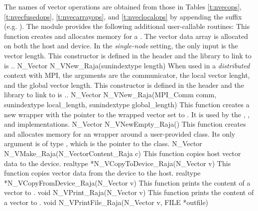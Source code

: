 The names of vector operations are obtained from those in Tables \ref{t:nvecops},
\ref{t:nvecfusedops}, \ref{t:nvecarrayops}, and \ref{t:nveclocalops}
by appending the suffix  (e.g. ).
The module {\nvecraja}  provides the following additional user-callable routines:
{
  This function creates and allocates memory for a {\cuda} .
  The vector data array is allocated on both the host and device.
}
{
  In the \textit{single-node} setting, the only input is the vector length. This
  constructor is defined in the header  and the library to
  link to is ..
}
{
  N\_Vector N\_VNew\_Raja(sunindextype length)
}
{
  When used in a \textit{distributed} context with MPI, the arguments are the
  {\mpi} communicator, the local vector lenght, and the global vector length.
  This constructor is defined in the header  and
  the library to link to is ..
}
{
  N\_Vector N\_VNew\_Raja(MPI\_Comm comm, sunindextype local\_length,
  sunindextype global\_length)
}
{
  This function creates a new {\nvector} wrapper with the pointer to
  the wrapped {\raja} vector set to . It is used by the
  , , and 
  implementations.
}
{
  N\_Vector N\_VNewEmpty\_Raja()
}
{
  This function creates and allocates memory for an {\nvecraja}
  wrapper around a user-provided  class.
  Its only argument is of type \newline
  , which is the pointer to the class.
}
{
  N\_Vector N\_VMake\_Raja(N\_VectorContent\_Raja c)
}
{
 This function copies host vector data to the device.
}
{
 realtype *N\_VCopyToDevice\_Raja(N\_Vector v)
}
{
  This function copies vector data from the device to the host.
}
{
  realtype *N\_VCopyFromDevice\_Raja(N\_Vector v)
}
{
  This function prints the content of a {\raja} vector to .
}
{
  void N\_VPrint\_Raja(N\_Vector v)
}
{
  This function prints the content of a {\raja} vector to .
}
{
  void N\_VPrintFile\_Raja(N\_Vector v, FILE *outfile)
}

